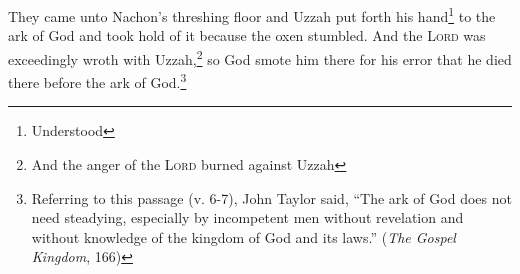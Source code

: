 


\begin{enumerate*}[mode=unboxed]
     They came unto Nachon's threshing floor and Uzzah put forth his hand\footnote{Understood} to the ark of God and took hold of it because the oxen stumbled.%
     And the \textsc{Lord} was exceedingly wroth with Uzzah,\footnote{And the anger of the \textsc{Lord} burned against Uzzah} so God smote him there for his error that he died there before the ark of God.\footnote{Referring to this passage (v. 6-7), John Taylor said, ``The ark of God does not need steadying, especially by incompetent men without revelation and without knowledge of the kingdom of God and its laws.'' (\textit{The Gospel Kingdom}, 166)}%
\end{enumerate*}
